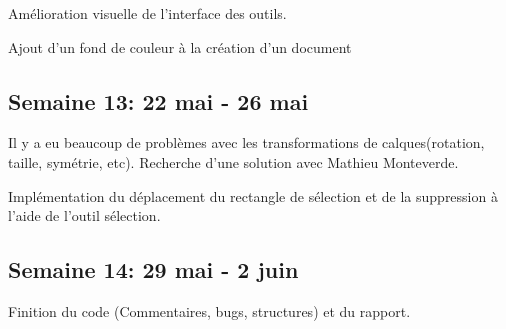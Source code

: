 Amélioration visuelle de l'interface des outils.

Ajout d'un fond de couleur à la création d'un document

\subsection{Semaine 13: 22 mai - 26 mai}
Il y a eu beaucoup de problèmes avec les transformations de calques(rotation, taille, symétrie, etc). Recherche d'une solution avec Mathieu Monteverde. 

Implémentation du déplacement du rectangle de sélection et de la suppression à l'aide de l'outil sélection.

\subsection{Semaine 14: 29 mai - 2 juin}
Finition du code (Commentaires, bugs, structures) et du rapport.




